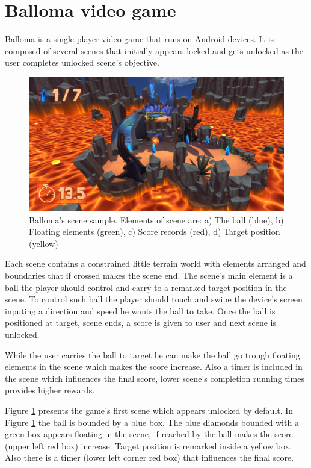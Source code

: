 \documentclass[peerreview,onecolumn]{IEEEtran}
\begin{document}
\section{Balloma video game}
  
   Balloma is a single-player video game that runs on Android devices. It is composed of several scenes that initially appears locked and gets unlocked as the user completes unlocked scene's objective. 
   
   \begin{figure}[!h]
		\centering
		\includegraphics[width=0.9\columnwidth]{img/balloma_scene.jpg} 
		\caption{Balloma's scene sample. Elements of scene are: a) The ball (blue), b) Floating elements (green), c) Score records (red), d) Target position (yellow)}
		\label{fig_scene}
	\end{figure}
   
   Each scene contains a constrained little terrain world with elements arranged and boundaries that if crossed makes the scene end. The scene's main element is a ball the player should control and carry to a remarked target position in the scene. To control such ball the player should touch and swipe the device's screen inputing a direction and speed he wants the ball to take. Once the ball is positioned at target, scene ends, a score is given to user and next scene is unlocked. 
   
   
   
   While the user carries the ball to target he can make the ball go trough floating elements in the scene which makes the score increase. Also a timer is included in the scene which influences the final score, lower scene's completion running times provides higher rewards.
   
   Figure \ref{fig_scene} presents the game's first scene which appears unlocked by default. In Figure \ref{fig_scene} the ball is bounded by a blue box. The blue diamonds bounded with a green box appears floating in the scene, if reached by the ball makes the score (upper left red box) increase. Target position is remarked inside a yellow box. Also there is a timer (lower left corner red box) that influences the final score.
   
\end{document}
